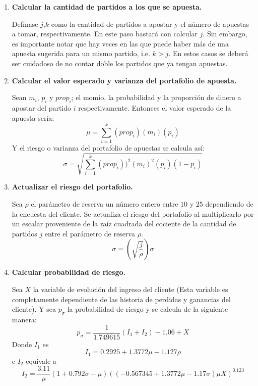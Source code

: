 \begin{enumerate}
	\item \textbf{Calcular la cantidad de partidos a los que se apuesta.}
	
	
Defínase $j$,$k$ como la cantidad de partidos a apostar y el número de apuestas a tomar, respectivamente.
En este paso bastará con calcular $j$. Sin embargo, es importante notar que hay veces en las que puede haber más de una apuesta sugerida para un mismo partido, i.e. $k>j$. En estos casos se deberá ser cuidadoso de no contar doble los partidos que ya tengan apuestas.

	\item \textbf{Calcular el valor esperado y varianza del portafolio de apuesta.}
	
	
	Sean $m_i$, $p_i$ y $prop_i$; el momio, la probabilidad y la proporción de dinero a apostar del partido $i$ respectivamente. Entonces el valor esperado de la apuesta sería:
	\[\mu = \sum_{i=1}^{k}{(prop_i)(m_i)(p_i)}\]
	Y el riesgo o varianza del portafolio de apuestas se calcula así:
	\[\sigma = \sqrt{\sum_{i=1}^{k}{(prop_i))^2(m_i)^2(p_i)(1-p_i)}}\]
	
	
	\item \textbf{Actualizar el riesgo del portafolio.}
	
	
	Sea $\rho$ el parámetro de reserva un número entero entre $10$ y $25$ dependiendo de la encuesta del cliente. Se actualiza el riesgo del portafolio al multiplicarlo por un escalar proveniente de la raíz cuadrada del cociente de la cantidad de partidos $j$ entre el parámetro de reserva $\rho$.
	\[\sigma = \left(\sqrt{\frac{j}{\rho}}\right)\sigma\]
	

	\item \textbf{Calcular probabilidad de riesgo.}
	
	Sea $X$ la variable de evolución del ingreso del cliente (Esta variable es completamente dependiente de las historia de perdidas y ganancias del cliente). Y sea $p_\sigma$ la probabilidad de riesgo y se calcula de la siguiente manera:
	\[p_\sigma = \frac{1}{1.749615}(I_1 + I_2) - 1.06 + X\]
	Donde $I_1$ es
	\[I_1 = 0.2925 +1.3772\mu - 1.127\rho\]
	e $I_2$ equivale a
	\[I_2 = \frac{3.11}{\mu}(1 + 0.792\sigma - \mu)((-0.567345 + 1.3772\mu -1.17\sigma)\mu X)^{0.123}\]
	

\end{enumerate}
